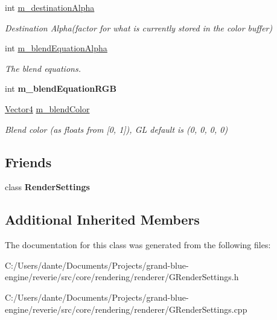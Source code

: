 \begin{Indent}
\begin{DoxyCompactItemize}
\mbox{\label{classrev_1_1_blend_setting_ae928cc65912bbbf16813301464e2ce3d}} 
int \mbox{\hyperlink{classrev_1_1_blend_setting_ae928cc65912bbbf16813301464e2ce3d}{m\+\_\+destination\+Alpha}}
\begin{DoxyCompactList}\small\item\em Destination Alpha(factor for what is currently stored in the color buffer) \end{DoxyCompactList}\item 
\mbox{\label{classrev_1_1_blend_setting_a398eb520ce54f9644d3cf218afa08108}} 
int \mbox{\hyperlink{classrev_1_1_blend_setting_a398eb520ce54f9644d3cf218afa08108}{m\+\_\+blend\+Equation\+Alpha}}
\begin{DoxyCompactList}\small\item\em The blend equations. \end{DoxyCompactList}\item 
\mbox{\label{classrev_1_1_blend_setting_ae28c2f1e84fb477076d46e46a08de741}} 
int {\bfseries m\+\_\+blend\+Equation\+R\+GB}
\item 
\mbox{\label{classrev_1_1_blend_setting_a59c18cb6b10f1dacb0284d1f747d8856}} 
\mbox{\hyperlink{classrev_1_1_vector}{Vector4}} \mbox{\hyperlink{classrev_1_1_blend_setting_a59c18cb6b10f1dacb0284d1f747d8856}{m\+\_\+blend\+Color}}
\begin{DoxyCompactList}\small\item\em Blend color (as floats from \mbox{[}0, 1\mbox{]}), GL default is (0, 0, 0, 0) \end{DoxyCompactList}\end{DoxyCompactItemize}
\end{Indent}
\subsection*{Friends}
\begin{DoxyCompactItemize}
\item 
\mbox{\label{classrev_1_1_blend_setting_abf433a9c39697ef25510a90f4cf565b0}} 
class {\bfseries Render\+Settings}
\end{DoxyCompactItemize}
\subsection*{Additional Inherited Members}


The documentation for this class was generated from the following files\+:\begin{DoxyCompactItemize}
\item 
C\+:/\+Users/dante/\+Documents/\+Projects/grand-\/blue-\/engine/reverie/src/core/rendering/renderer/G\+Render\+Settings.\+h\item 
C\+:/\+Users/dante/\+Documents/\+Projects/grand-\/blue-\/engine/reverie/src/core/rendering/renderer/G\+Render\+Settings.\+cpp\end{DoxyCompactItemize}
